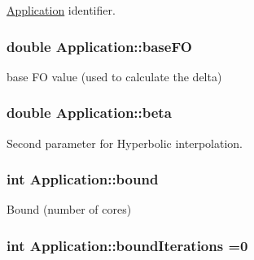 \hyperlink{classApplication}{Application} identifier. 

\hypertarget{classApplication_aa703e7525d446d98b5cd51c959d35998}{
\subsubsection[{base\-F\-O}]{\setlength{\rightskip}{0pt plus 5cm}double Application\-::base\-F\-O\hspace{0.3cm}{\ttfamily [private]}}}\label{classApplication_aa703e7525d446d98b5cd51c959d35998}


base F\-O value (used to calculate the delta) 

\hypertarget{classApplication_a356ffae49ae223b3d98b57e56210e3a9}{
\subsubsection[{beta}]{\setlength{\rightskip}{0pt plus 5cm}double Application\-::beta\hspace{0.3cm}{\ttfamily [private]}}}\label{classApplication_a356ffae49ae223b3d98b57e56210e3a9}


Second parameter for Hyperbolic interpolation. 

\hypertarget{classApplication_a6e91bef9d503af0e8ba38c8f445c8cb0}{
\subsubsection[{bound}]{\setlength{\rightskip}{0pt plus 5cm}int Application\-::bound\hspace{0.3cm}{\ttfamily [private]}}}\label{classApplication_a6e91bef9d503af0e8ba38c8f445c8cb0}


Bound (number of cores) 

\hypertarget{classApplication_a6a3692743eccba602a58fdfc3f23950b}{
\subsubsection[{bound\-Iterations}]{\setlength{\rightskip}{0pt plus 5cm}int Application\-::bound\-Iterations =0\hspace{0.3cm}{\ttfamily [private]}}}\label{classApplication_a6a3692743eccba602a58fdfc3f23950b}


